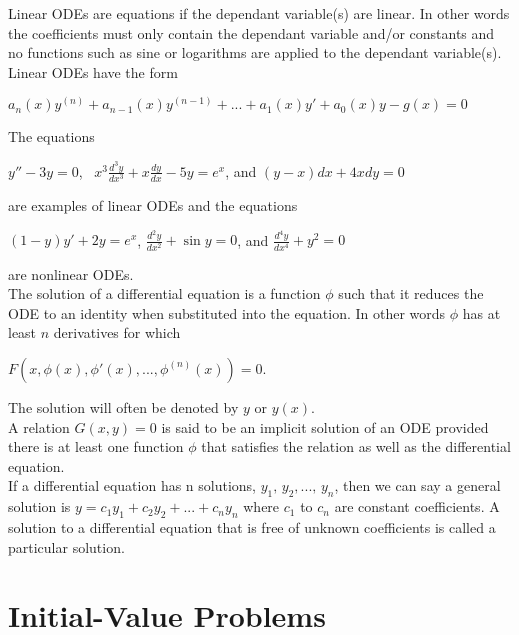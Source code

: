 \documentclass{report}
\begin{document}
        Linear ODEs are equations if the dependant variable(s) are linear. In other words the 
        coefficients must only contain the dependant variable and/or constants and no functions such as 
        sine or logarithms are applied to the dependant variable(s). Linear ODEs have the form 
        \begin{center}
            \(a_n(x)y^{(n)}+a_{n-1}(x)y^{(n-1)} + ... + a_1(x)y'+a_0(x)y-g(x) = 0\)
        \end{center}
        The equations 
        \begin{center}
            \(y''-3y=0\), \, \(x^3\frac{d^3y}{dx^3}+x\frac{dy}{dx}-5y=e^x\), and \((y-x)dx+4xdy=0\)
        \end{center}
        are examples of linear ODEs and the equations
        \begin{center}
            \((1-y)y'+2y=e^x\), \(\frac{d^2y}{dx^2}+\sin y = 0\), and \(\frac{d^4y}{dx^4}+y^2 = 0\)
        \end{center}
        are nonlinear ODEs.\\

        The solution of a differential equation is a function \(\phi\) such that it reduces the ODE to an identity when 
        substituted into the equation. In other words \(\phi\) has at least \(n\) derivatives for which
        \begin{center}
            \(F(x, \phi(x), \phi'(x),...,\phi^{(n)}(x)) = 0\).
        \end{center}
        The solution will often be denoted by \(y\) or \(y(x)\).\\

        A relation \(G(x,y)=0\) is said to be an implicit solution of an ODE provided there is at least one function 
        \(\phi\) that satisfies the relation as well as the differential equation.\\

        If a differential equation has n solutions, \(y_1 , \, y_2, ..., \, y_n\), then we can say a general solution 
        is \(y = c_1y_1 + c_2y_2 + ... + c_ny_n\) where \(c_1\) to \(c_n\) are constant coefficients. A solution to 
        a differential equation that is free of unknown coefficients is called a particular solution. 
    \section{Initial-Value Problems}
\end{document}
